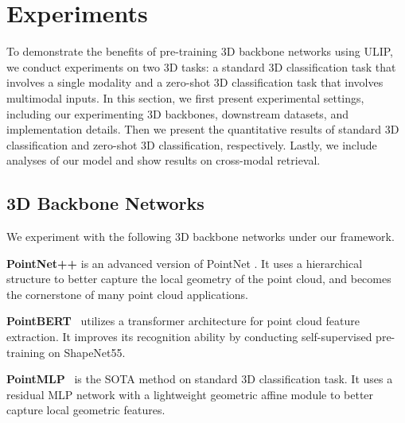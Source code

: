 \documentclass[10pt,twocolumn,letterpaper]{article}
\begin{document}
\section{Experiments}
\label{sec:experiments}
To demonstrate the benefits of pre-training 3D backbone networks using ULIP, we conduct experiments on two 3D tasks: a standard 3D classification task that involves a single modality and a zero-shot 3D classification task that involves multimodal inputs.
In this section, we first present experimental settings, including our experimenting 3D backbones, downstream datasets, and implementation details.
Then we present the quantitative results of standard 3D classification and zero-shot 3D classification, respectively. Lastly, we include analyses of our model and show results on cross-modal retrieval.

\subsection{3D Backbone Networks}
We experiment with the following 3D backbone networks under our framework.

\noindent\textbf{PointNet++} \cite{qi2017pointnet++} is an advanced version of PointNet \cite{qi2017pointnet}. It uses a hierarchical structure to better capture the local geometry of the point cloud, and becomes the cornerstone of many point cloud applications.

\noindent\textbf{PointBERT}~\cite{yu2022point} utilizes a transformer architecture for point cloud feature extraction. It improves its recognition ability by conducting self-supervised pre-training on ShapeNet55.

\noindent\textbf{PointMLP}~\cite{ma2022rethinking} is the SOTA method on standard 3D classification task. It uses a residual MLP network with a lightweight geometric affine module to better capture local geometric features.
\end{document}

